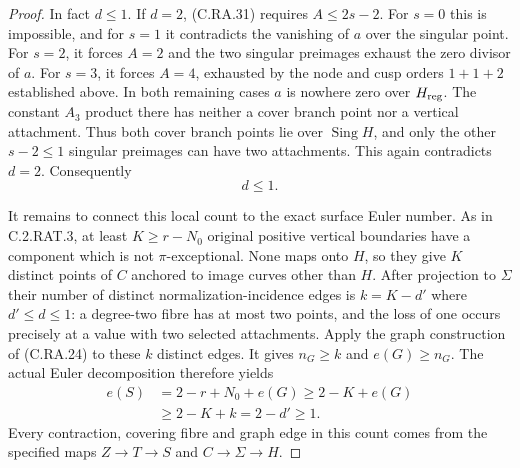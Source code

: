 \begin{proof}
In fact $d\le1$. If $d=2$, (C.RA.31) requires
$A\le2s-2$. For $s=0$ this is impossible, and for
$s=1$ it contradicts the vanishing of $a$ over the
singular point. For $s=2$, it forces $A=2$ and
the two singular preimages exhaust the zero divisor
of $a$. For $s=3$, it forces $A=4$, exhausted by
the node and cusp orders $1+1+2$ established above.
In both remaining cases $a$ is nowhere zero over
$H_{\rm reg}$. The constant $A_3$ product there
has neither a cover branch point nor a vertical
attachment. Thus both cover branch points lie
over $\operatorname{Sing}H$, and only the other
$s-2\le1$ singular preimages can have two
attachments. This again contradicts $d=2$.
Consequently
\[
                            d\le1.
\tag{C.RA.31a}
\]

It remains to connect this local count to the exact
surface Euler number. As in C.2.RAT.3, at least
$K\ge r-N_0$ original positive vertical boundaries
have a component which is not $\pi$-exceptional.
None maps onto $H$, so they give $K$ distinct points
of $C$ anchored to image curves other than $H$.
After projection to $\Sigma$ their number of distinct
normalization-incidence edges is $k=K-d'$ where
$d'\le d\le1$: a degree-two fibre has at most two
points, and the loss of one occurs precisely at a
value with two selected attachments. Apply the graph
construction of (C.RA.24) to these $k$ distinct
edges. It gives $n_G\ge k$ and $e(G)\ge n_G$.
The actual Euler decomposition therefore yields
\[
\begin{split}
 e(S)&=2-r+N_0+e(G)
       \ge2-K+e(G)\\
     &\ge2-K+k=2-d'\ge1.
\end{split}
\tag{C.RA.32}
\]
Every contraction, covering fibre and graph edge in
this count comes from the specified maps
$Z\to T\to S$ and $C\to\Sigma\to H$.
\end{proof}
